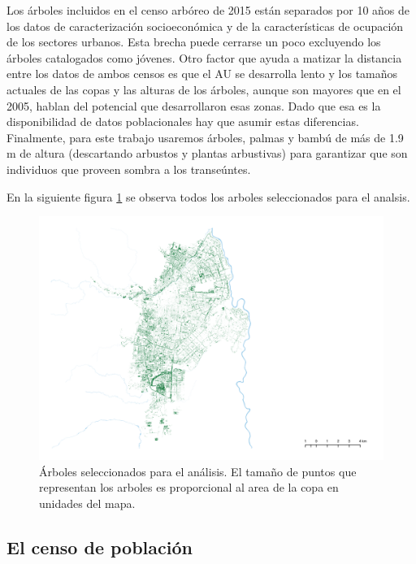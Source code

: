 \documentclass[12pt,]{book}
\begin{document}
Los árboles incluidos en el censo arbóreo de 2015 están separados por 10
años de los datos de caracterización socioeconómica y de la
características de ocupación de los sectores urbanos. Esta brecha puede
cerrarse un poco excluyendo los árboles catalogados como jóvenes. Otro
factor que ayuda a matizar la distancia entre los datos de ambos censos
es que el AU se desarrolla lento y los tamaños actuales de las copas y
las alturas de los árboles, aunque son mayores que en el 2005, hablan
del potencial que desarrollaron esas zonas. Dado que esa es la
disponibilidad de datos poblacionales hay que asumir estas diferencias.
Finalmente, para este trabajo usaremos árboles, palmas y bambú de más de
1.9 m de altura (descartando arbustos y plantas arbustivas) para
garantizar que son individuos que proveen sombra a los transeúntes.

En la siguiente figura \ref{fig:capa-ca2015sel} se observa todos los
arboles seleccionados para el analsis.

\begin{figure}
\includegraphics[width=1\linewidth]{images/arboles_sombra} \caption{Árboles seleccionados para el análisis. El tamaño de puntos que representan los arboles es proporcional al area de la copa en unidades del mapa.}\label{fig:capa-ca2015sel}
\end{figure}

\subsection{El censo de población}\label{el-censo-de-poblacion}
\end{document}
